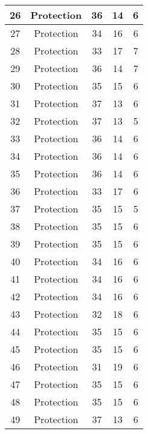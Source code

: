 \documentclass[results.tex]{subfiles}
\begin{document}
\begin{center}
\begin{tabular}{| c || c | c | c | c |}
    \hline
    26 & Protection & 36 & 14 & 6 \\ 
    \hline
    27 & Protection & 34 & 16 & 6 \\ 
    \hline
    28 & Protection & 33 & 17 & 7 \\ 
    \hline
    29 & Protection & 36 & 14 & 7 \\ 
    \hline
    30 & Protection & 35 & 15 & 6 \\ 
    \hline
    31 & Protection & 37 & 13 & 6 \\ 
    \hline
    32 & Protection & 37 & 13 & 5 \\ 
    \hline
    33 & Protection & 36 & 14 & 6 \\ 
    \hline
    34 & Protection & 36 & 14 & 6 \\ 
    \hline
    35 & Protection & 36 & 14 & 6 \\ 
    \hline
    36 & Protection & 33 & 17 & 6 \\ 
    \hline
    37 & Protection & 35 & 15 & 5 \\ 
    \hline
    38 & Protection & 35 & 15 & 6 \\ 
    \hline
    39 & Protection & 35 & 15 & 6 \\ 
    \hline
    40 & Protection & 34 & 16 & 6 \\ 
    \hline
    41 & Protection & 34 & 16 & 6 \\ 
    \hline
    42 & Protection & 34 & 16 & 6 \\ 
    \hline
    43 & Protection & 32 & 18 & 6 \\ 
    \hline
    44 & Protection & 35 & 15 & 6 \\ 
    \hline
    45 & Protection & 35 & 15 & 6 \\ 
    \hline
    46 & Protection & 31 & 19 & 6 \\ 
    \hline
    47 & Protection & 35 & 15 & 6 \\ 
    \hline
    48 & Protection & 35 & 15 & 6 \\ 
    \hline
    49 & Protection & 37 & 13 & 6 \\ 
    \hline   \end{tabular}
\end{center}
\end{document}
